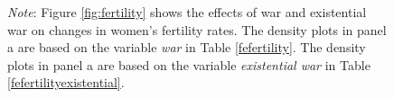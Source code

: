 \documentclass [12pt] {article}
\renewcommand{\footnotesize}{\scriptsize} %
\begin{document}
\begin{figure}[h]
  \begin{flushleft}  
        {\footnotesize {\it Note}: Figure \ref{fig:fertility} shows the effects of war and existential war on changes in women's fertility rates. The density plots in panel a are based on the variable {\it war} in Table \ref{fefertility}. The density plots in panel a are based on the variable {\it existential war} in Table \ref{fefertilityexistential}.}
       \end{flushleft} 
\end{figure}
\end{document}
